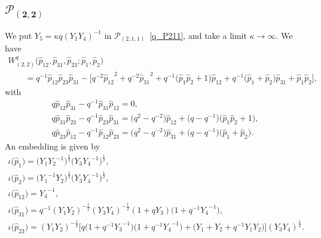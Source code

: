 \documentclass[pdftex]{sigma}
\numberwithin{equation}{section}
\begin{document}
\subsection[$\mathcal{P}_{(2,2)}$]{$\boldsymbol{\mathcal{P}_{(2,2)}}$}
We put $Y_5=\kappa q ( Y_1 Y_4 )^{-1}$ in $\mathcal{P}_{(2,1,1)}$~\eqref{q_P211}, and take a limit $\kappa\to\infty$. We have
\begin{gather*}
 W^q_{(2,2)} \big( \hat{p}_{12}, \hat{p}_{31}, \hat{p}_{23}; \hat{p}_1, \hat{p}_2\big) \\
 \qquad {}=q^{-1} \hat{p}_{12} \hat{p}_{23} \hat{p}_{31} - \big[ q^{-2} {\hat{p}_{12}}^{2} +q^{-2} {\hat{p}_{31}}^{2}
 + q^{-1} \big( \hat{p}_1 \hat{p}_2 + 1 \big) \hat{p}_{12} + q^{-1} \big( \hat{p}_1 + \hat{p}_2 \big) \hat{p}_{31} +\hat{p}_1 \hat{p}_2 \big],
\end{gather*}
with
\begin{gather*}
q \hat{p}_{12} \hat{p}_{31} - q^{-1} \hat{p}_{31} \hat{p}_{12} =0 , \\
q \hat{p}_{31} \hat{p}_{23} - q^{-1} \hat{p}_{23} \hat{p}_{31} = \big( q^2 - q^{-2} \big) \hat{p}_{12} + \big(q-q^{-1}\big) \big( \hat{p}_1 \hat{p}_2 + 1 \big) , \\
q \hat{p}_{23} \hat{p}_{12} - q^{-1} \hat{p}_{12} \hat{p}_{23} = \big( q^2 - q^{-2} \big) \hat{p}_{31} + \big(q-q^{-1}\big) \big( \hat{p}_1+ \hat{p}_2 \big) .
\end{gather*}
An embedding is given by
\begin{gather}
\iota\big(\hat{p}_1\big) = \big(Y_1 {Y_2}^{-1}\big)^{\frac{1}{2}} \big( Y_3 {Y_4}^{-1}\big)^{\frac{1}{2}} , \nonumber\\
\iota\big(\hat{p}_2\big) = \big({Y_1}^{-1} {Y_2}\big)^{\frac{1}{2}} \big( Y_3 {Y_4}^{-1}\big)^{\frac{1}{2}} , \nonumber\\
\iota\big(\hat{p}_{12}\big) = {Y_4}^{-1} , \nonumber\\
\iota\big(\hat{p}_{31}\big) = q^{-1} (Y_1 Y_2)^{-\frac{1}{2}} (Y_3 Y_4)^{-\frac{1}{2}} ( 1 + q Y_3 ) \big( 1 + q^{-1} {Y_4}^{-1} \big) , \nonumber\\
\iota\big(\hat{p}_{23}\big) = (Y_1 Y_2 )^{-\frac{1}{2}} \big[ q \big( 1 + q^{-1} {Y_3}^{-1} \big) \big( 1 + q^{-1} {Y_4}^{-1}\big) + \big( Y_1 + Y_2 + q^{-1} Y_1 Y_2 \big)\big] (Y_3 Y_4)^{\frac{1}{2}} . \label{q_P22}
\end{gather}
\end{document}
